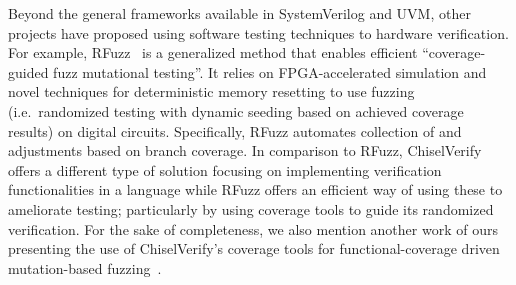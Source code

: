 \documentclass[conference]{IEEEtran}
\begin{document}

Beyond the general frameworks available in SystemVerilog and UVM, other projects have proposed 
using software testing techniques to hardware verification. For example, RFuzz~\cite{rfuzz2018} 
is a generalized method that enables efficient ``coverage-guided fuzz mutational testing''. 
It relies on FPGA-accelerated simulation and novel techniques for deterministic memory 
resetting to use fuzzing (i.e.\ randomized testing with dynamic seeding based on achieved 
coverage results) on digital circuits. Specifically, RFuzz automates collection of and adjustments 
based on branch coverage. In comparison to RFuzz, ChiselVerify offers a different type 
of solution focusing on implementing verification functionalities in a language while 
RFuzz offers an efficient way of using these to ameliorate testing; particularly by using coverage 
tools to guide its randomized verification. For the sake of completeness, we also mention another 
work of ours presenting the use of ChiselVerify's coverage tools for functional-coverage driven mutation-based
fuzzing~\cite{verify:fuzzing:2021}.
\end{document}
